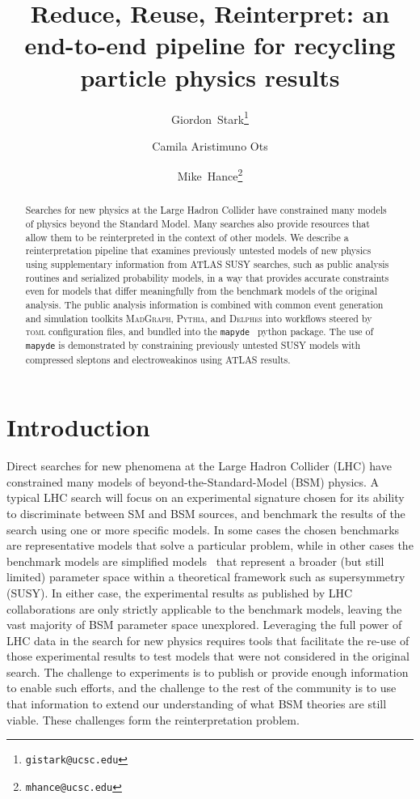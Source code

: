 \documentclass{article}
\title{Reduce, Reuse, Reinterpret: an end-to-end pipeline for recycling particle physics results}
\author[ \,,1]{\orcidaffil{0000-0001-6616-3433}Giordon~Stark\thanks{\texttt{gistark@ucsc.edu}}}
\author[12]{Camila Aristimuno Ots}
\author[ \,,1]{\orcidaffil{0000-0001-8392-0934}Mike~Hance\thanks{\texttt{mhance@ucsc.edu}}}
\affil[1]{University of California, Santa Cruz\\ Santa Cruz Institute for Particle Physics\\1156 High Street\\Santa Cruz, CA 95064}
\affil[2]{University of Southern California\\ Liquid Propulsion Laboratory\\ 854 Downey Way, Los Angeles, CA 90089}
\newcommand{\mapyde}{\texttt{mapyde}}
\newcommand{\madgraph}{\textsc{MadGraph}}
\newcommand{\pythia}{\textsc{Pythia}}
\newcommand{\delphes}{\textsc{Delphes}}
\newcommand{\toml}{\textsc{toml}}
\begin{document}
\maketitle

\begin{abstract}
	Searches for new physics at the Large Hadron Collider have constrained many models of physics beyond the Standard Model.  Many searches also provide resources that allow them to be reinterpreted in the context of other models.  We describe a reinterpretation pipeline that examines previously untested models of new physics using supplementary information from ATLAS SUSY searches, such as public analysis routines and serialized probability models, in a way that provides accurate constraints even for models that differ meaningfully from the benchmark models of the original analysis.  The public analysis information is combined with common event generation and simulation toolkits \madgraph, \pythia, and \delphes{} into workflows steered by \toml{} configuration files, and bundled into the \mapyde{}~\cite{mapyde} python package.  The use of \mapyde{} is demonstrated by constraining previously untested SUSY models with compressed sleptons and electroweakinos using ATLAS results.
\end{abstract}


\section{Introduction}
\label{sec:introduction}

Direct searches for new phenomena at the Large Hadron Collider (LHC) have constrained many models of beyond-the-Standard-Model (BSM) physics.  A typical LHC search will focus on an experimental signature chosen for its ability to discriminate between SM and BSM sources, and benchmark the results of the search using one or more specific models.  In some cases the chosen benchmarks are representative models that solve a particular problem, while in other cases the benchmark models are simplified models~\cite{LHCNewPhysicsWorkingGroup:2011mji} that represent a broader (but still limited) parameter space within a theoretical framework such as supersymmetry (SUSY).  In either case, the experimental results as published by LHC collaborations are only strictly applicable to the benchmark models, leaving the vast majority of BSM parameter space unexplored.  Leveraging the full power of LHC data in the search for new physics requires tools that facilitate the re-use of those experimental results to test models that were not considered in the original search.  The challenge to experiments is to publish or provide enough information to enable such efforts, and the challenge to the rest of the community is to use that information to extend our understanding of what BSM theories are still viable.  These challenges form the reinterpretation problem.
\end{document}
